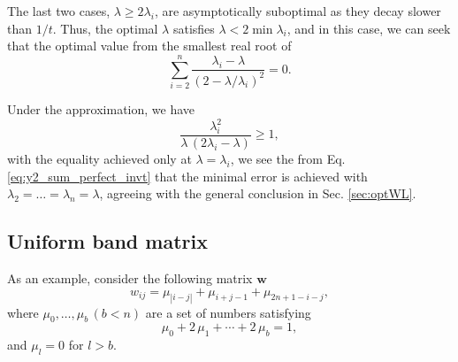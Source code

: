 \documentclass[reprint]{revtex4-1}
\begin{document}
%
The last two cases, $\lambda \ge 2\lambda_i$,
are asymptotically suboptimal
as they decay slower than $1/t$.
%
Thus, the optimal $\lambda$
satisfies $\lambda < 2 \min \lambda_i$,
and in this case,
we can seek that
the optimal value from
the smallest real root of
%
\begin{equation}
\sum_{i = 2}^n
\frac{ \lambda_i - \lambda }
{ \left(2 - \lambda/ \lambda_i \right)^2 }
= 0.
\label{eq:optimal_lambda_approx}
\end{equation}



Under the approximation, we have
$$
\frac{ \lambda_i^2 }{ \lambda \, (2 \lambda_i - \lambda) } \ge 1,
$$
with the equality achieved only at $\lambda = \lambda_i$,
we see the from Eq. \eqref{eq:y2_sum_perfect_invt}
that the minimal error is achieved with
$\lambda_2 = \dots = \lambda_n = \lambda$,
agreeing with the general conclusion
in Sec. \ref{sec:optWL}.




\subsection{\label{sec:band-matrix}
Uniform band matrix}



As an example, consider the following matrix $\mathbf w$
%
\begin{equation}
  w_{ij} = \mu_{|i-j|} + \mu_{i+j-1} + \mu_{2n+1-i-j},
  \label{eq:w_band}
\end{equation}
%
where $\mu_0, \dots, \mu_b \, (b < n)$
are a set of numbers satisfying
%
\begin{equation}
\mu_0 + 2 \, \mu_1 + \cdots + 2 \, \mu_b = 1,
\label{eq:m_normalization}
\end{equation}
%
and $\mu_l = 0$ for $l > b$.
\end{document}
